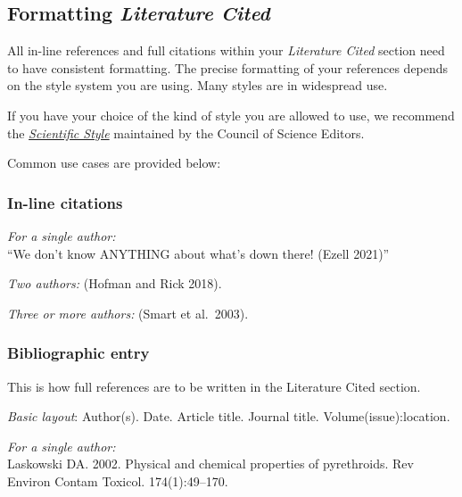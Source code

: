 \documentclass[
]{book}
\begin{document}
\hypertarget{formatting-literature-cited}{%
\subsection*{\texorpdfstring{Formatting \emph{Literature Cited}}{Formatting Literature Cited}}\label{formatting-literature-cited}}

All in-line references and full citations within your \emph{Literature Cited} section need to have consistent formatting. The precise formatting of your references depends on the style system you are using. Many styles are in widespread use.

If you have your choice of the kind of style you are allowed to use, we recommend the \href{https://www.scientificstyleandformat.org/Tools/SSF-Citation-Quick-Guide.html}{\emph{Scientific Style}} maintained by the Council of Science Editors.

Common use cases are provided below:

\hypertarget{in-line-citations}{%
\subsubsection*{In-line citations}\label{in-line-citations}}

\emph{For a single author:}\\
``We don't know ANYTHING about what's down there! (Ezell 2021)''

\emph{Two authors:} (Hofman and Rick 2018).

\emph{Three or more authors:} (Smart et al.~2003).

\hypertarget{bibliographic-entry}{%
\subsubsection*{Bibliographic entry}\label{bibliographic-entry}}

This is how full references are to be written in the Literature Cited section.

\emph{Basic layout}: Author(s). Date. Article title. Journal title. Volume(issue):location.

\emph{For a single author:}\\
Laskowski DA. 2002. Physical and chemical properties of pyrethroids. Rev Environ Contam Toxicol. 174(1):49--170.
\end{document}
